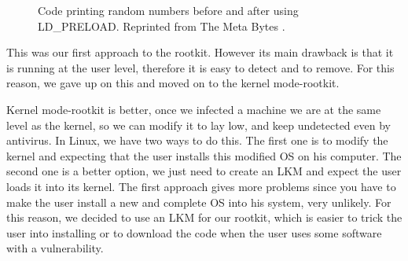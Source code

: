 \documentclass[11pt, a4paper,twoside]{tesi_upf}
\begin{document}
\begin{figure}
    \centering
    \qquad
    \caption{Code printing random numbers before and after using LD\_PRELOAD. Reprinted from The Meta Bytes \cite{ld-preload-trick}.}
    \label{fig:random-numbers}
\end{figure}

This was our first approach to the rootkit. However its main drawback is that it is running at the user level, therefore it is easy to detect and to remove. For this reason, we gave up on this and moved on to the kernel mode-rootkit.

Kernel mode-rootkit is better, once we infected a machine we are at the same level as the kernel, so we can modify it to lay low, and keep undetected even by antivirus. In Linux, we have two ways to do this. The first one is to modify the kernel and expecting that the user installs this modified OS on his computer. The second one is a better option, we just need to create an LKM and expect the user loads it into its kernel. The first approach gives more problems since you have to make the user install a new and complete OS into his system, very unlikely. For this reason, we decided to use an LKM for our rootkit, which is easier to trick the user into installing or to download the code when the user uses some software with a vulnerability.
\end{document}
